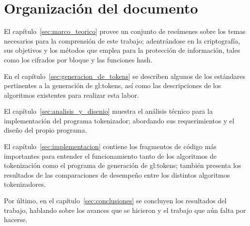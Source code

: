 %
%
%

\section{Organización del documento}

El capítulo~\ref{sec:marco_teorico} provee un conjunto de resúmenes sobre los
temas necesarios para la comprensión de este trabajo; adentrándose en la
criptografía, sus objetivos y los métodos que emplea para la protección de
información, tales como los cifrados por bloque y las funciones hash.

En el capítulo~\ref{sec:generacion_de_tokens} se describen algunos de los
estándares pertinentes a la generación de \glspl{gl:token}, así como las
descripciones de los algoritmos existentes para realizar esta labor.

El capítulo~\ref{sec:analisis_y_disenio} muestra el análisis técnico para
la implementación del programa tokenizador; abordando sus requerimientos y el
diseño del propio programa.

El capítulo~\ref{sec:implementacion} contiene los fragmentos de código más
importantes para entender el funcionamiento tanto de los algoritmos de
tokenización como el programa de generación de \glspl{gl:token}; también
presenta los resultados de las comparaciones de desempeño entre los
distintos algoritmos tokenizadores.

Por último, en el capítulo~\ref{sec:conclusiones} se concluyen los resultados
del trabajo, hablando sobre los avances que se hicieron y el trabajo que aún
falta por hacerse.
